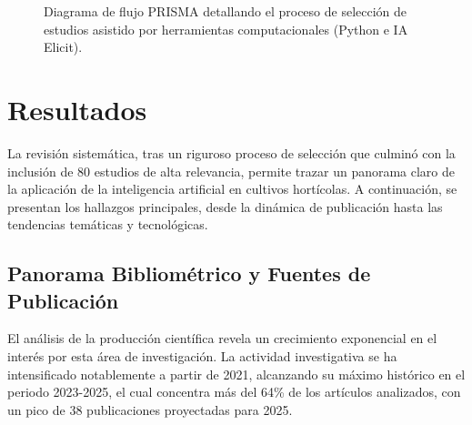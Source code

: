 \documentclass[agriculture,article,submit,pdftex,moreauthors]{Definitions/mdpi}
\begin{document}
\begin{figure}[h!]
{
}%
\caption{Diagrama de flujo PRISMA detallando el proceso de selección de estudios asistido por herramientas computacionales (Python e IA Elicit).}
\label{fig:prisma_flow}
\end{figure}
\section{Resultados}

La revisión sistemática, tras un riguroso proceso de selección que culminó con la inclusión de 80 estudios de alta relevancia, permite trazar un panorama claro de la aplicación de la inteligencia artificial en cultivos hortícolas. A continuación, se presentan los hallazgos principales, desde la dinámica de publicación hasta las tendencias temáticas y tecnológicas.

\subsection{Panorama Bibliométrico y Fuentes de Publicación}
El análisis de la producción científica revela un crecimiento exponencial en el interés por esta área de investigación. La actividad investigativa se ha intensificado notablemente a partir de 2021, alcanzando su máximo histórico en el periodo 2023-2025, el cual concentra más del 64\% de los artículos analizados, con un pico de 38 publicaciones proyectadas para 2025.
\end{document}
